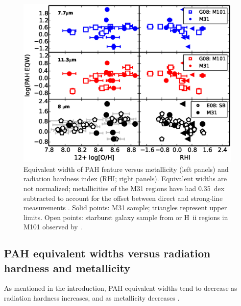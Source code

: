 \begin{figure}
\centering
\includegraphics[scale=0.85]{./fig9.eps}
\caption{Equivalent width of  PAH feature versus metallicity (left panels) and radiation hardness index (RHI; right panels).
Equivalent  widths are not normalized; metallicities of the M31 regions have had 0.35~dex subtracted to account for the offset  between direct and strong-line measurements \citep{Croley2015}. 
Solid points: M31 sample; triangles represent upper limits. Open points:  starburst galaxy sample from \citet[bottom panels]{Engelbracht_2008} or
 H~{\sc ii} regions in M101 observed  by \citet[middle and top panels]{Gordon:2008lr}.  
}
\label{rhi_met_eqw}
\end{figure}


\subsection{PAH equivalent widths versus radiation hardness and metallicity}
\label{sect:eqw_rh}

As mentioned in the introduction, PAH equivalent widths tend to decrease as radiation hardness increases,
and as metallicity decreases \citep{Calzetti:2010fk}.  

